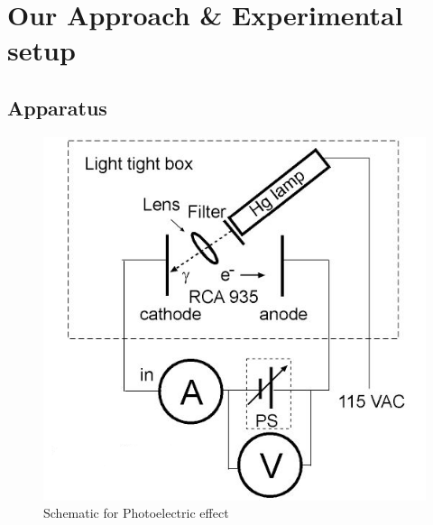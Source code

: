 \documentclass[11pt,letterpaper,onecolumn]{article}
\begin{document}

\section{Our Approach \& Experimental setup}

\subsection{Apparatus}




\begin{figure}[H]
 \begin{center}
 \includegraphics*[scale = .6]{Apperatus.png}
 \caption{Schematic for Photoelectric effect\label{fig:app} }
 \end{center}
\end{figure}
\end{document}
